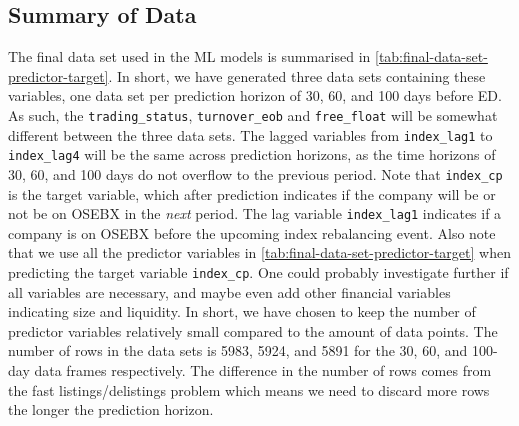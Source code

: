 \subsection{Summary of Data}

The final data set used in the ML models is summarised in \autoref{tab:final-data-set-predictor-target}. In short, we have generated three data sets containing these variables, one data set per prediction horizon of 30, 60, and 100 days before ED. As such, the \texttt{trading\_status}, \texttt{turnover\_eob} and \texttt{free\_float} will be somewhat different between the three data sets. The lagged variables from \texttt{index\_lag1} to \texttt{index\_lag4} will be the same across prediction horizons, as the time horizons of 30, 60, and 100 days do not overflow to the previous period. Note that \texttt{index\_cp} is the target variable, which after prediction indicates if the company will be or not be on OSEBX in the \textit{next} period. The lag variable \texttt{index\_lag1} indicates if a company is on OSEBX before the upcoming index rebalancing event. Also note that we use all the predictor variables in \autoref{tab:final-data-set-predictor-target} when predicting the target variable \texttt{index\_cp}. One could probably investigate further if all variables are necessary, and maybe even add other financial variables indicating size and liquidity. In short, we have chosen to keep the number of predictor variables relatively small compared to the amount of data points. The number of rows in the data sets is 5983, 5924, and 5891 for the 30, 60, and 100-day data frames respectively. The difference in the number of rows comes from the fast listings/delistings problem which means we need to discard more rows the longer the prediction horizon.



